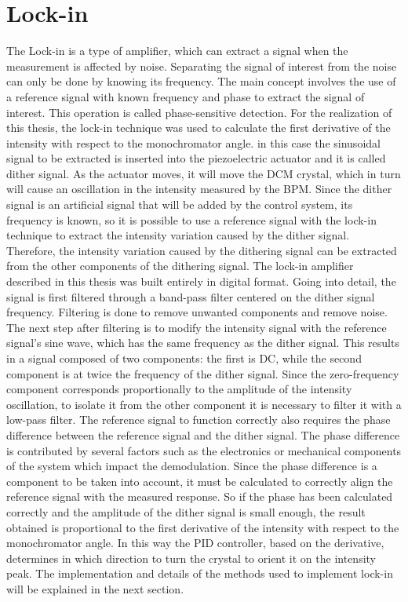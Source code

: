\section{Lock-in}

The Lock-in is a type of amplifier, which can extract a signal when the measurement is affected by noise.
Separating the signal of interest from the noise can only be done by knowing its frequency.
The main concept involves the use of a reference signal with known frequency and phase to extract the signal of interest.
This operation is called phase-sensitive detection.
For the realization of this thesis, the lock-in technique was used to calculate the first derivative of the intensity with respect to the monochromator angle.
in this case the sinusoidal signal to be extracted is inserted into the piezoelectric actuator and it is called dither signal.
As the actuator moves, it will move the DCM crystal, which in turn will cause an oscillation in the intensity measured by the BPM.
Since the dither signal is an artificial signal that will be added by the control system, its frequency is known, so it is possible to use a reference signal with the lock-in technique to extract the intensity variation caused by the dither signal.
Therefore, the intensity variation caused by the dithering signal can be extracted from the other components of the dithering signal.
The lock-in amplifier described in this thesis was built entirely in digital format.
Going into detail, the signal is first filtered through a band-pass filter centered on the dither signal frequency.
Filtering is done to remove unwanted components and remove noise.
The next step after filtering is to modify the intensity signal with the reference signal's sine wave, which has the same frequency as the dither signal. 
This results in a signal composed of two components: the first is DC, while the second component is at twice the frequency of the dither signal.
Since the zero-frequency component corresponds proportionally to the amplitude of the intensity oscillation, to isolate it from the other component it is necessary to filter it with a low-pass filter.
The reference signal to function correctly also requires the phase difference between the reference signal and the dither signal. 
The phase difference is contributed by several factors such as the electronics or mechanical components of the system which impact the demodulation.
Since the phase difference is a component to be taken into account, it must be calculated to correctly align the reference signal with the measured response.
So if the phase has been calculated correctly and the amplitude of the dither signal is small enough, the result obtained is proportional to the first derivative of the intensity with respect to the monochromator angle.
In this way the PID controller, based on the derivative, determines in which direction to turn the crystal to orient it on the intensity peak.
The implementation and details of the methods used to implement lock-in will be explained in the next section.


